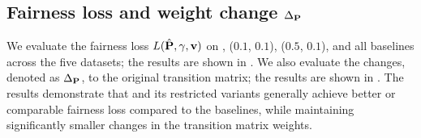 \documentclass[sigconf, anonymous, review]{acmart}
\begin{document}

\subsection{Fairness loss and weight change \texorpdfstring{$\Delta_\mathbf{{P}}$}{Delta $P$}}

We evaluate the fairness loss $L(\hat{\mathbf{{P}}}, \gamma, \mathbf{{v}})$
on \fairgd, {\fairgd}($0.1$, $0.1$), {\fairgd}($0.5$, $0.1$), and all baselines across the five datasets; 
the results are shown in . 
We also evaluate the changes, denoted as $\Delta_\mathbf{{P}}$, to the original transition matrix; 
the results are shown in .
The results demonstrate that \fairgd and its restricted variants generally achieve better or comparable fairness loss compared to the baselines, while maintaining significantly smaller changes in the transition matrix weights.
\end{document}
